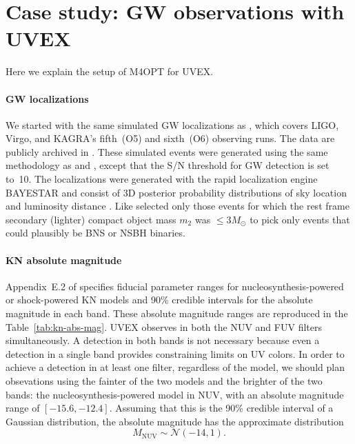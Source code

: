 \documentclass[twocolumn,times]{aastex631}
\begin{document}
\section{Case study: GW observations with UVEX}

Here we explain the setup of \ac{M4OPT} for \ac{UVEX}.

\paragraph{\Ac{GW} localizations}
We started with the same simulated \ac{GW} localizations as \citet{2025arXiv250114109C}, which covers LIGO, Virgo, and KAGRA's fifth~(O5) and sixth~(O6) observing runs. The data are publicly archived in \cite{r_weizmann_2025_14585837}. These simulated events were generated using the same methodology as \citet{2022ApJ...924...54P} and \citet{2023ApJ...958..158K}, except that the \ac{S/N} threshold for \ac{GW} detection is set to~10. The localizations were generated with the rapid localization engine BAYESTAR \citep{2016PhRvD..93b4013S} and consist of 3D posterior probability distributions of sky location and luminosity distance \citep{2016ApJ...829L..15S,2016ApJS..226...10S}. Like \citet{2025arXiv250114109C} selected only those events for which the rest frame secondary (lighter) compact object mass $m_2$ was $\leq 3 M_\odot$ to pick only events that could plausibly be \ac{BNS} or \ac{NSBH} binaries.

\paragraph{\Ac{KN} absolute magnitude}
Appendix~E.2 of \citet{2021arXiv211115608K} specifies fiducial parameter ranges for nucleosynthesis-powered or shock-powered \ac{KN} models and 90\% credible intervals for the absolute magnitude in each band. These absolute magnitude ranges are reproduced in the Table~\ref{tab:kn-abs-mag}. \ac{UVEX} observes in both the \ac{NUV} and \ac{FUV} filters simultaneously. A detection in both bands is not necessary because even a detection in a single band provides constraining limits on \ac{UV} colors. In order to achieve a detection in at least one filter, regardless of the model, we should plan obsevations using the fainter of the two models and the brighter of the two bands: the nucleosynthesis-powered model in NUV, with an absolute magnitude range of $[-15.6, -12.4]$. Assuming that this is the 90\% credible interval of a Gaussian distribution, the absolute magnitude has the approximate distribution
%
\begin{equation}
    \label{eq:absmag-distn}
    M_\mathrm{NUV} \sim \mathcal{N}(-14, 1).
\end{equation}
\end{document}
